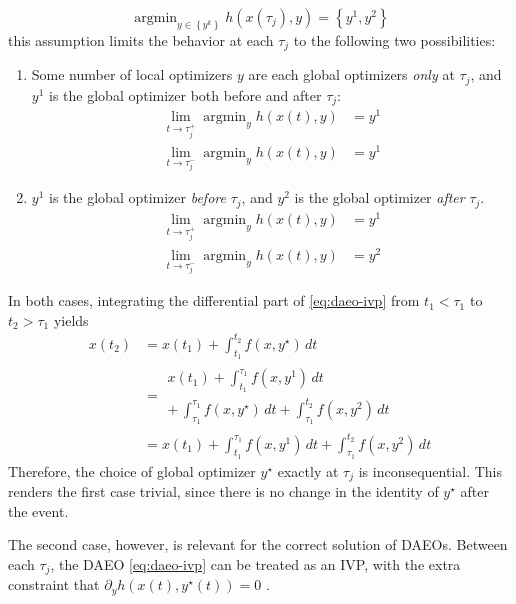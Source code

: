 \documentclass[twoside,leqno, twocolumn]{article}
\DeclareMathOperator*{\argmin}{\arg\min}
\begin{document}
\begin{equation*}
	\argmin_{y\in\left\{y^k\right\}} h(x(\tau_j), y) = \left\{y^1, y^2\right\}
\end{equation*}
this assumption limits the behavior at each $\tau_j$ to the following two possibilities:
\begin{enumerate}
	\item Some number of local optimizers $y$ are each global optimizers \textit{only} at $\tau_j$, and $y^1$ is the global optimizer both before and after $\tau_j$:
	\begin{equation*}
		\begin{aligned}
			\lim_{t\to \tau_j^+} \argmin_{y} h(x(t), y) &= y^1\\
			\lim_{t\to \tau_j^-} \argmin_{y} h(x(t), y) &= y^1
		\end{aligned}
	\end{equation*}
	\item $y^1$ is the global optimizer \textit{before} $\tau_j$, and $y^2$ is the global optimizer \textit{after} $\tau_j$.
	\begin{equation*}
		\begin{aligned}
			\lim_{t\to \tau_j^+} \argmin_{y} h(x(t), y) &= y^1\\
			\lim_{t\to \tau_j^-} \argmin_{y} h(x(t), y) &= y^2
		\end{aligned}
	\end{equation*}
\end{enumerate}
In both cases, integrating the differential part of \eqref{eq:daeo-ivp} from $t_1 < \tau_1$ to $t_2 > \tau_1$ yields
\begin{equation}
	\begin{aligned}
		x(t_2) &= x(t_1) + \int_{t_1}^{t_2}f(x, y^\star)\,dt\\
		&=\begin{split}
			x(t_1) + \int_{t_1}^{\tau_1}f(x, y^1)\,dt\\
			+\,\int_{\tau_1}^{\tau_1}f(x, y^\star)\,dt +\int_{\tau_1}^{t_2}f(x, y^2)\,dt
		\end{split}\\
		&=x(t_1) + \int_{t_1}^{\tau_1}f(x, y^1)\,dt + \int_{\tau_1}^{t_2}f(x, y^2)\,dt
	\end{aligned}
\end{equation}
Therefore, the choice of global optimizer $y^\star$ exactly at $\tau_j$ is inconsequential. This renders the first case trivial, since there is no change in the identity of $y^\star$ after the event.

The second case, however, is relevant for the correct solution of DAEOs. Between each $\tau_j$, the DAEO \eqref{eq:daeo-ivp} can be treated as an IVP, with the extra constraint that $\partial_{y} h(x(t), y^\star(t)) = 0$ \cite{deussenSubdomainSeparabilityGlobal2023}.
\end{document}
